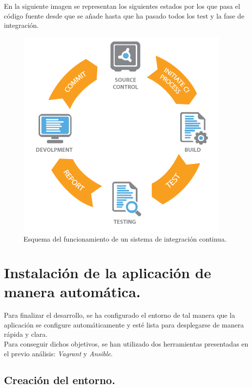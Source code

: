 En la siguiente imagen se representan los siguientes estados por los que pasa el código fuente desde que se añade hasta que ha pasado todos los test y la fase de integración.

\begin{figure}[H]
	\centering
	\includegraphics[scale=0.6]{imagenes/continuous-integration.png}
	\caption{Esquema del funcionamiento de un sistema de integración continua. \label{fig:figura14}}
\end{figure}

\section{Instalación de la aplicación de manera automática.}
Para finalizar el desarrollo, se ha configurado el entorno de tal manera que la aplicación se configure automáticamente y esté lista para desplegarse de manera rápida y clara.\\

Para conseguir dichos objetivos, se han utilizado dos herramientas presentadas en el previo análisis: \textit{Vagrant} y \textit{Ansible}. 

\subsection{Creación del entorno.}


